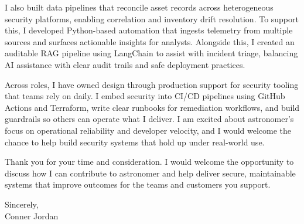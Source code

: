 \documentclass[letterpaper,11pt]{article}
\begin{document}
\vspace{16pt}

I also built data pipelines that reconcile asset records across heterogeneous security platforms, enabling correlation and inventory drift resolution. To support this, I developed Python-based automation that ingests telemetry from multiple sources and surfaces actionable insights for analysts. Alongside this, I created an auditable RAG pipeline using LangChain to assist with incident triage, balancing AI assistance with clear audit trails and safe deployment practices.

\vspace{16pt}

Across roles, I have owned design through production support for security tooling that teams rely on daily. I embed security into CI/CD pipelines using GitHub Actions and Terraform, write clear runbooks for remediation workflows, and build guardrails so others can operate what I deliver. I am excited about astronomer's focus on operational reliability and developer velocity, and I would welcome the chance to help build security systems that hold up under real-world use.

\vspace{16pt}

Thank you for your time and consideration. I would welcome the opportunity to discuss how I can contribute to astronomer and help deliver secure, maintainable systems that improve outcomes for the teams and customers you support.

\vspace{16pt}

Sincerely,\\
Conner Jordan
\end{document}
